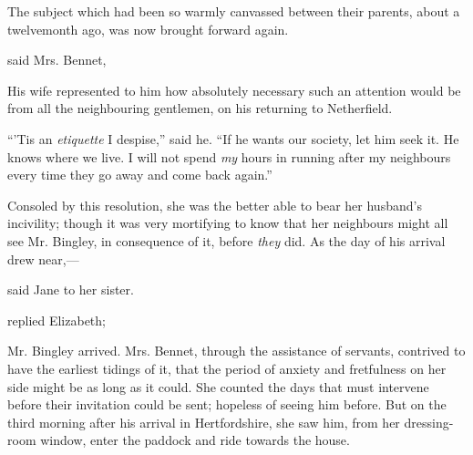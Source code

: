 The subject which had been so warmly canvassed between their parents, about a twelvemonth ago, was now brought forward again.

 said Mrs. Bennet, 


His wife represented to him how absolutely necessary such an attention would be from all the neighbouring gentlemen, on his returning to Netherfield.

“'Tis an {\em etiquette} I despise,” said he. “If he wants our society, let him seek it. He knows where we live. I will not spend {\em my} hours in running after my neighbours every time they go away and come back again.”


Consoled by this resolution, she was the better able to bear her husband's incivility; though it was very mortifying to know that her neighbours might all see Mr. Bingley, in consequence of it, before {\em they} did. As the day of his arrival drew near,---

 said Jane to her sister. 

 replied Elizabeth; 

Mr. Bingley arrived. Mrs. Bennet, through the assistance of servants, contrived to have the earliest tidings of it, that the period of anxiety and fretfulness on her side might be as long as it could. She counted the days that must intervene before their invitation could be sent; hopeless of seeing him before. But on the third morning after his arrival in Hertfordshire, she saw him, from her dressing-room window, enter the paddock and ride towards the house.

